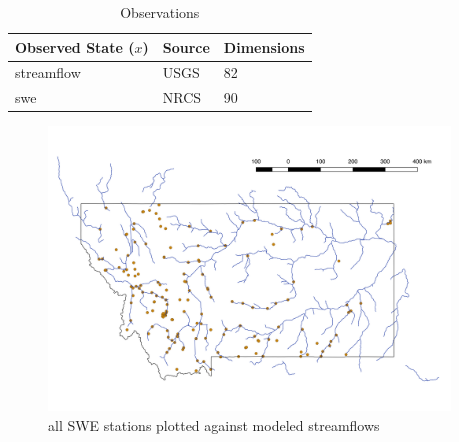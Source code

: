 \begin{table}[]
\caption{Observations} 
\begin{tabular}{lll}
Observed State ($x$) & Source                              & Dimensions  \\ \hline
streamflow  & USGS & 82   \\
swe         & NRCS & 90
\end{tabular}
\label{tab:obs}
\end{table}

\begin{figure}[h]
    \centering
    \includegraphics[width=0.95\textwidth]{stations}
    \caption{all SWE stations plotted against modeled streamflows}
    \label{fig:stations}
\end{figure}